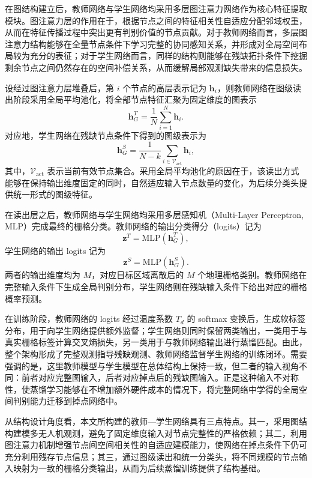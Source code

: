 在图结构建立后，教师网络与学生网络均采用多层图注意力网络作为核心特征提取模块。图注意力层的作用在于，根据节点之间的特征相关性自适应分配邻域权重，从而在特征传播过程中突出更有判别价值的节点贡献。对于教师网络而言，多层图注意力结构能够在全量节点条件下学习完整的协同感知关系，并形成对全局空间布局较为充分的表征；对于学生网络而言，同样的结构则能够在残缺拓扑条件下挖掘剩余节点之间仍然存在的空间补偿关系，从而缓解局部观测缺失带来的信息损失。

设经过图注意力层堆叠后，第 \(i\) 个节点的高层表示记为 \(\mathbf{h}_i\)，则教师网络在图级读出阶段采用全局平均池化，将全部节点特征汇聚为固定维度的图表示
\begin{equation}
\mathbf{h}_{G}^{T}
=
\frac{1}{N}\sum_{i=1}^{N}\mathbf{h}_i.
\end{equation}
对应地，学生网络在残缺节点条件下得到的图级表示为
\begin{equation}
\mathbf{h}_{G}^{S}
=
\frac{1}{N-k}\sum_{i\in\mathcal{V}_{\mathrm{act}}}\mathbf{h}_i,
\end{equation}
其中，\(\mathcal{V}_{\mathrm{act}}\) 表示当前有效节点集合。采用全局平均池化的原因在于，该读出方式能够在保持输出维度固定的同时，自然适应输入节点数量的变化，为后续分类头提供统一形式的图级特征。

在读出层之后，教师网络与学生网络均采用多层感知机（Multi-Layer Perceptron, MLP）完成最终的栅格分类。教师网络的输出分类得分（logits）记为
\begin{equation}
\mathbf{z}^{T}
=
\mathrm{MLP}(\mathbf{h}_{G}^{T}),
\end{equation}
学生网络的输出 logits 记为
\begin{equation}
\mathbf{z}^{S}
=
\mathrm{MLP}(\mathbf{h}_{G}^{S}).
\end{equation}
两者的输出维度均为 \(M\)，对应目标区域离散后的 \(M\) 个地理栅格类别。教师网络在完整输入条件下生成全局判别分布，学生网络则在残缺输入条件下给出对应的栅格概率预测。

在训练阶段，教师网络的 logits 经过温度系数 \(T_d\) 的 softmax 变换后，生成软标签分布，用于向学生网络提供额外监督；学生网络则同时保留两类输出，一类用于与真实栅格标签计算交叉熵损失，另一类用于与教师网络输出进行蒸馏匹配。由此，整个架构形成了完整观测指导残缺观测、教师网络监督学生网络的训练闭环。需要强调的是，这里教师模型与学生模型在总体结构上保持一致，但二者的输入视角不同：前者对应完整图输入，后者对应掉点后的残缺图输入。正是这种输入不对称性，使蒸馏学习能够在不增加额外硬件成本的情况下，将完整网络中学得的全局空间判别能力迁移到掉点网络中。

从结构设计角度看，本文所构建的教师—学生网络具有三点特点。其一，采用图结构建模多无人机观测，避免了固定维度输入对节点完整性的严格依赖；其二，利用图注意力机制增强节点间空间相关性的自适应建模能力，使网络在掉点条件下仍可充分利用残存节点信息；其三，通过图级读出和统一分类头，将不同规模的节点输入映射为一致的栅格分类输出，从而为后续蒸馏训练提供了结构基础。

